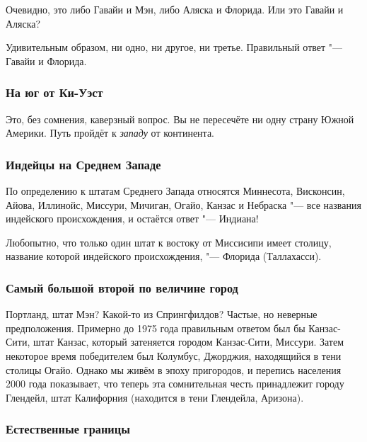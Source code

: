 \documentclass[twoside]{book}
\begin{document}
Очевидно, это либо Гавайи и Мэн, либо Аляска и Флорида.
Или это Гавайи и Аляска?

\medskip

Удивительным образом, ни одно, ни другое, ни третье.
Правильный ответ "--- Гавайи и Флорида.\heart

\subsubsection*{На юг от Ки-Уэст}%

Это, без сомнения, каверзный вопрос. %
Вы не пересечёте ни одну страну Южной Америки.
Путь пройдёт к \emph{западу} от континента.
\heart

\subsubsection*{Индейцы на Среднем Западе}%

По определению к штатам Среднего Запада относятся Миннесота, Висконсин, Айова,
Иллинойс, Миссури, Мичиган, Огайо, Канзас и Небраска "--- все названия индейского
происхождения, и остаётся ответ "--- Индиана!\heart

Любопытно, что только один штат к востоку от Миссисипи имеет столицу, название которой индейского происхождения, "--- Флорида (Таллахасси).

\subsubsection*{Самый большой второй по величине город}%

Портланд, штат Мэн? Какой-то из Спрингфилдов? 
Частые, но неверные предположения.
Примерно до 1975 года правильным ответом был бы Канзас-Сити, штат Канзас, который затеняется городом Канзас-Сити, Миссури.
Затем некоторое время победителем был Колумбус, Джорджия, находящийся в тени столицы Огайо.
Однако мы живём в эпоху пригородов, и %
перепись населения 2000 года показывает, что теперь эта сомнительная честь принадлежит городу Глендейл, штат Калифорния (находится в тени Глендейла, Аризона).\heart

\subsubsection*{Естественные границы}%
\end{document}
